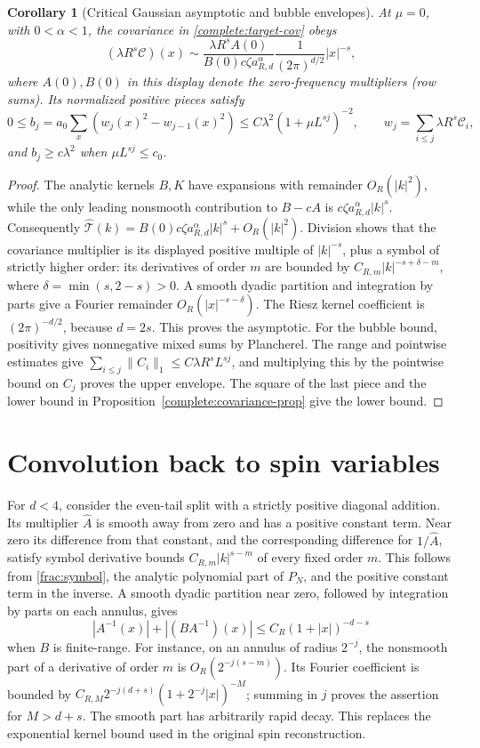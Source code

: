 \documentclass[11pt]{article}
\newtheorem{corollary}[proposition]{Corollary}
\begin{document}
\begin{corollary}[Critical Gaussian asymptotic and bubble envelopes]
\label{complete:covariance-consequences}
At \(\mu=0\), with \(0<\alpha<1\), the covariance in
\eqref{complete:target-cov} obeys
\[
 (\lambda R^s\mathscr C)(x)\sim
 \frac{\lambda R^s A(0)}{B(0)c\zeta a_{R,d}^\alpha}
 \frac1{(2\pi)^{d/2}}|x|^{-s},
\]
where \(A(0),B(0)\) in this display denote the zero-frequency
multipliers (row sums). Its normalized positive pieces satisfy
\[
 0\le b_j=a_0\sum_x(w_j(x)^2-w_{j-1}(x)^2)
       \le C\lambda^2(1+\mu L^{sj})^{-2},
 \qquad w_j=\sum_{i\le j}\lambda R^s\mathscr C_i,
\]
and \(b_j\ge c\lambda^2\) when \(\mu L^{sj}\le c_0\).
\end{corollary}
\begin{proof}
The analytic kernels \(B,K\) have expansions with remainder
\(O_R(|k|^2)\), while the only leading nonsmooth contribution to
\(B-cA\) is \(c\zeta a_{R,d}^\alpha|k|^s\).
Consequently \(\widehat{\mathscr T}(k)
=B(0)c\zeta a_{R,d}^\alpha|k|^s+O_R(|k|^2)\).
Division shows that the covariance multiplier is its displayed
positive multiple of \(|k|^{-s}\), plus a symbol of strictly higher
order: its derivatives of order \(m\) are bounded by
\(C_{R,m}|k|^{-s+\delta-m}\), where
\(\delta=\min(s,2-s)>0\). A smooth dyadic partition and integration
by parts give a Fourier remainder \(O_R(|x|^{-s-\delta})\).
The Riesz kernel coefficient is \((2\pi)^{-d/2}\), because
\(d=2s\). This proves the asymptotic.
For the bubble bound, positivity gives nonnegative mixed sums by
Plancherel. The range and pointwise estimates give
\(\sum_{i\le j}\|C_i\|_1\le C\lambda R^sL^{sj}\), and multiplying
this by the pointwise bound on \(C_j\) proves the upper envelope.
The square of the last piece and the lower bound in
Proposition~\ref{complete:covariance-prop} give the lower bound.
\end{proof}

\section{Convolution back to spin variables}
\label{frac:inverse-kernels}

For \(d<4\), consider the even-tail split with a strictly
positive diagonal addition. Its multiplier \(\widehat A\) is
smooth away from zero and has a positive constant term. Near
zero its difference from that constant, and the corresponding
difference for \(1/\widehat A\), satisfy symbol derivative
bounds \(C_{R,m}|k|^{s-m}\) of every fixed order \(m\).
This follows from \eqref{frac:symbol}, the analytic polynomial
part of \(P_N\), and the positive constant term in the inverse.
A smooth dyadic partition near zero, followed by integration
by parts on each annulus, gives
\[
 |A^{-1}(x)|+|(BA^{-1})(x)|
     \le C_R(1+|x|)^{-d-s}
\]
when \(B\) is finite-range. For instance, on an annulus of radius
\(2^{-j}\), the nonsmooth part of a derivative of order \(m\)
is \(O_R(2^{-j(s-m)})\). Its Fourier coefficient is bounded by
\(C_{R,M}2^{-j(d+s)}(1+2^{-j}|x|)^{-M}\); summing in \(j\)
proves the assertion for \(M>d+s\). The smooth part has
arbitrarily rapid decay. This replaces the exponential kernel
bound used in the original spin reconstruction.
\end{document}
